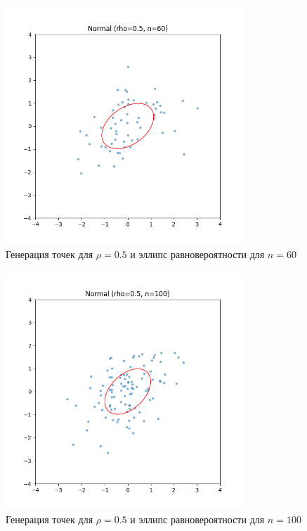 \documentclass[a4paper]{article}
\begin{document}
    \begin{figure}[H]
        \centering
        \includegraphics[width=0.8\textwidth]{./plots/normal_rho0.5_n60}
        \caption{Генерация точек для $\rho = 0.5$ и эллипс равновероятности для $n=60$}
        \label{fig:normal_rho0.5_n60}
    \end{figure}

    \begin{figure}[H]
        \centering
        \includegraphics[width=0.8\textwidth]{./plots/normal_rho0.5_n100}
        \caption{Генерация точек для $\rho = 0.5$ и эллипс равновероятности для $n=100$}
        \label{fig:normal_rho0.5_n100}
    \end{figure}
\end{document}
